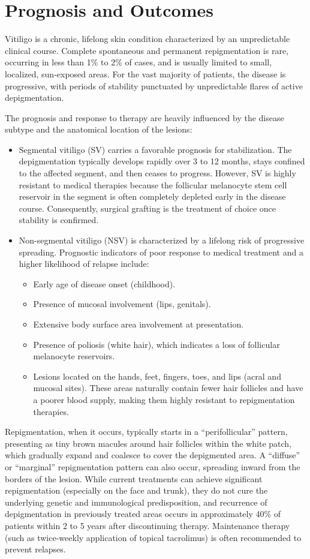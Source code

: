 \section*{Prognosis and Outcomes}
Vitiligo is a chronic, lifelong skin condition characterized by an unpredictable clinical course. Complete spontaneous and permanent repigmentation is rare, occurring in less than 1\% to 2\% of cases, and is usually limited to small, localized, sun-exposed areas. For the vast majority of patients, the disease is progressive, with periods of stability punctuated by unpredictable flares of active depigmentation.

The prognosis and response to therapy are heavily influenced by the disease subtype and the anatomical location of the lesions:
\begin{itemize}
    \item Segmental vitiligo (SV) carries a favorable prognosis for stabilization. The depigmentation typically develops rapidly over 3 to 12 months, stays confined to the affected segment, and then ceases to progress. However, SV is highly resistant to medical therapies because the follicular melanocyte stem cell reservoir in the segment is often completely depleted early in the disease course. Consequently, surgical grafting is the treatment of choice once stability is confirmed.
    \item Non-segmental vitiligo (NSV) is characterized by a lifelong risk of progressive spreading. Prognostic indicators of poor response to medical treatment and a higher likelihood of relapse include:
    \begin{itemize}
        \item Early age of disease onset (childhood).
        \item Presence of mucosal involvement (lips, genitals).
        \item Extensive body surface area involvement at presentation.
        \item Presence of poliosis (white hair), which indicates a loss of follicular melanocyte reservoirs.
        \item Lesions located on the hands, feet, fingers, toes, and lips (acral and mucosal sites). These areas naturally contain fewer hair follicles and have a poorer blood supply, making them highly resistant to repigmentation therapies.
    \end{itemize}
\end{itemize}
Repigmentation, when it occurs, typically starts in a ``perifollicular'' pattern, presenting as tiny brown macules around hair follicles within the white patch, which gradually expand and coalesce to cover the depigmented area. A ``diffuse'' or ``marginal'' repigmentation pattern can also occur, spreading inward from the borders of the lesion. While current treatments can achieve significant repigmentation (especially on the face and trunk), they do not cure the underlying genetic and immunological predisposition, and recurrence of depigmentation in previously treated areas occurs in approximately 40\% of patients within 2 to 5 years after discontinuing therapy. Maintenance therapy (such as twice-weekly application of topical tacrolimus) is often recommended to prevent relapses.

